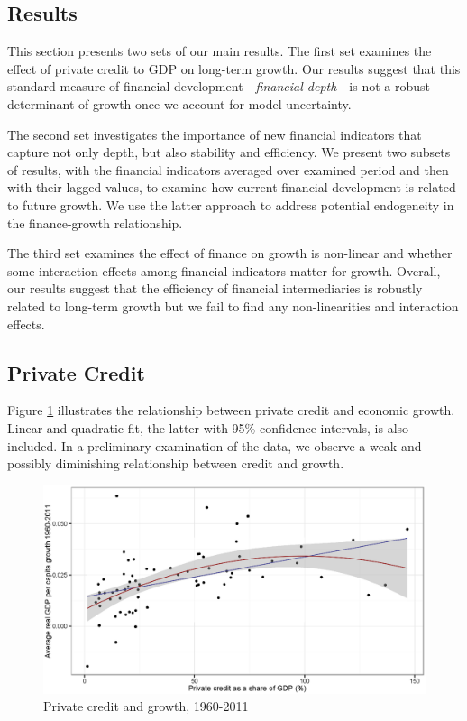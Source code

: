 \begin{refsection}
\section{Results}
\label{ch2sec:Results}
This section presents two sets of our main results. The first set examines the effect of private credit to GDP on long-term growth. Our results suggest that this standard measure of financial development - \textit{financial depth} - is not a robust determinant of growth once we account for model uncertainty.

The second set investigates the importance of new financial indicators that capture not only depth, but also stability and efficiency. We present two subsets of results, with the financial indicators averaged over examined period and then with their lagged values, to examine how current financial development is related to future growth. We use the latter approach to address potential endogeneity in the finance-growth relationship. 

The third set examines the effect of finance on growth is non-linear and whether some interaction effects among financial indicators matter for growth. Overall, our results suggest that the efficiency of financial intermediaries is robustly related to long-term growth but we fail to find any non-linearities and interaction effects.

%
%
\subsection{Private Credit}
\label{ch2subsec:PC}
%
Figure \ref{ch2fig:OLSPCGDP} illustrates the relationship between private credit and economic growth. Linear and quadratic fit, the latter with 95\% confidence intervals, is also included. In a preliminary examination of the data, we observe a weak and possibly diminishing relationship between credit and growth.
%
\begin{figure}[!ht]
	\begin{center}
		\setlength{\fboxsep}{0pt}
		\includegraphics[width=\linewidth]{Figures/ch2/PConGDP1960-2011.eps}
		\caption{Private credit and growth, 1960-2011}
		\label{ch2fig:OLSPCGDP}
	\end{center}
\end{figure}


\end{refsection}
